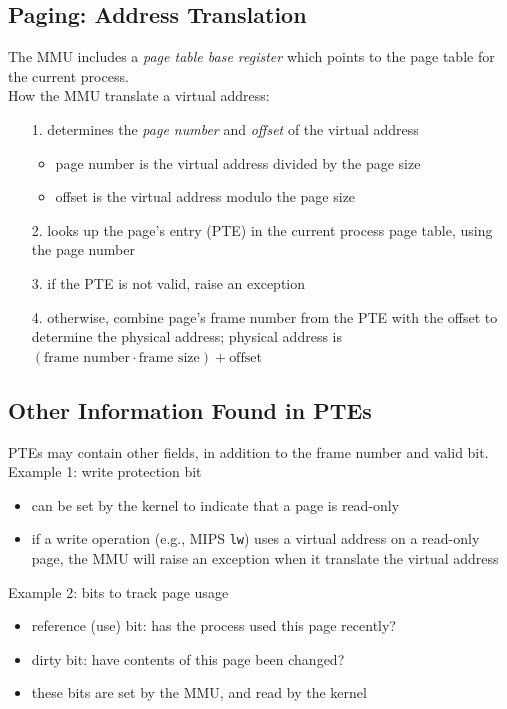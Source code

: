 \documentclass[12pt]{article}
\theoremstyle{plain}
\theoremstyle{definition}
\begin{document}
\subsection{Paging: Address Translation}
The MMU includes a \emph{page table base register} which points to the page table for the current process. \\

How the MMU translate a virtual address:
\begin{enumerate}
  \item[1.] determines the \emph{page number} and \emph{offset} of the virtual address
  \begin{itemize}
    \item page number is the virtual address divided by the page size
    \item offset is the virtual address modulo the page size
  \end{itemize}
  \item[2.] looks up the page's entry (PTE) in the current process page table, using the page number
  \item[3.] if the PTE is not valid, raise an exception
  \item[4.] otherwise, combine page's frame number from the PTE with the offset to determine the physical address;
  physical address is $(\text{frame number} \cdot \text{frame size}) + \text{offset}$ \\
\end{enumerate}

\subsection{Other Information Found in PTEs}
PTEs may contain other fields, in addition to the frame number and valid bit. \\

Example 1: write protection bit
\begin{itemize}
  \item can be set by the kernel to indicate that a page is read-only
  \item if a write operation (e.g., MIPS \texttt{lw}) uses a virtual address on a read-only page, the MMU will raise an exception when it translate the virtual address
\end{itemize}

Example 2: bits to track page usage
\begin{itemize}
  \item reference (use) bit: has the process used this page recently?
  \item dirty bit: have contents of this page been changed?
  \item these bits are set by the MMU, and read by the kernel
\end{itemize}
\end{document}
